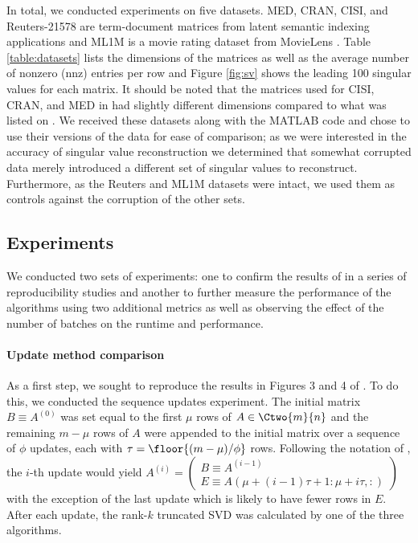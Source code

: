 In total, we conducted experiments on five datasets. MED, CRAN, CISI, and Reuters-21578 are term-document matrices from latent semantic indexing applications \cite{LSISite,Cai2005,Cai2007,Cai2008,Cai2009} and ML1M is a movie rating dataset from MovieLens \cite{Harper2015}. Table \ref{table:datasets} lists the dimensions of the matrices as well as the average number of nonzero (nnz) entries per row and Figure \ref{fig:sv} shows the leading 100 singular values for each matrix. It should be noted that the matrices used for CISI, CRAN, and MED in \cite{Kalantzis2021} had slightly different dimensions compared to what was listed on \cite{LSISite}. We received these datasets along with the MATLAB code and chose to use their versions of the data for ease of comparison; as we were interested in the accuracy of singular value reconstruction we determined that somewhat corrupted data merely introduced a different set of singular values to reconstruct. Furthermore, as the Reuters and ML1M datasets were intact, we used them as controls against the corruption of the other sets.



\subsection{Experiments}

We conducted two sets of experiments: one to confirm the results of \cite{Kalantzis2021} in a series of reproducibility studies and another to further measure the performance of the algorithms using two additional metrics as well as observing the effect of the number of batches on the runtime and performance.

\paragraph{Update method comparison} 

As a first step, we sought to reproduce the results in Figures 3 and 4 of \cite{Kalantzis2021}. To do this, we conducted the sequence updates experiment. The initial matrix $B\equiv A^{(0)}$ was set equal to the first $\mu$ rows of $A\in\Ctwo{m}{n}$ and the remaining $m-\mu$ rows of $A$ were appended to the initial matrix over a sequence of $\phi$ updates, each with $\tau=\floor{(m-\mu)/\phi}$ rows. Following the notation of \cite{Kalantzis2021}, the $i$-th update would yield $A^{(i)} = \begin{pmatrix} B\equiv A^{(i-1)} \\ E\equiv A(\mu+(i-1)\tau+1:\mu+i\tau,:) \end{pmatrix}$ with the exception of the last update which is likely to have fewer rows in $E$. After each update, the rank-$k$ truncated SVD was calculated by one of the three algorithms.

